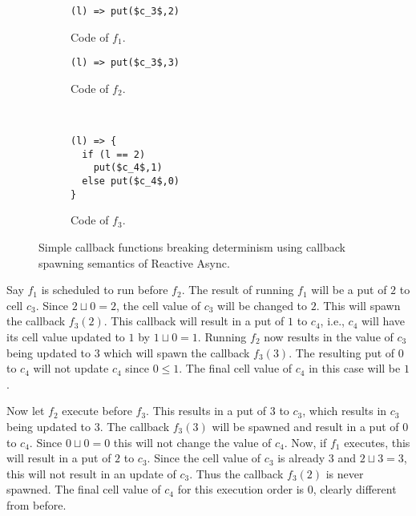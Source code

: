 \begin{figure}
  \begin{minipage}{0.5\textwidth}
    \begin{subfigure}[b]{\linewidth}
      \begin{lstlisting}
(l) => put($c_3$,2)
      \end{lstlisting}
      \caption{Code of $f_1$.}
    \end{subfigure}
    \begin{subfigure}[b]{\linewidth}
      \begin{lstlisting}
(l) => put($c_3$,3)
      \end{lstlisting}
      \caption{Code of $f_2$.}
    \end{subfigure}
  \end{minipage}
  ~
  \begin{minipage}{0.5\textwidth}
    \begin{subfigure}[b]{\linewidth}
      \begin{lstlisting}
(l) => {
  if (l == 2)
    put($c_4$,1)
  else put($c_4$,0)
}
      \end{lstlisting}
      \caption{Code of $f_3$.}
    \end{subfigure}
  \end{minipage}
  \caption{Simple callback functions breaking determinism using callback
  spawning semantics of Reactive Async.}
  \label{fig:ra_fun_callback_spawn}
\end{figure}

Say $f_1$ is scheduled to run before $f_2$. The result of running $f_1$ will be
a put of $2$ to cell $c_3$.  Since $2 \sqcup 0 = 2$, the cell value of $c_3$
will be changed to $2$. This will spawn the callback $f_3(2)$. This callback
will result in a put of $1$ to $c_4$, i.e., $c_4$ will have its cell value
updated to $1$ by $1 \sqcup 0 = 1$.  Running $f_2$ now results in the value of
$c_3$ being updated to $3$ which will spawn the callback $f_3(3)$. The resulting
put of $0$ to $c_4$ will not update $c_4$ since $0 \leq 1$. The final cell value
of $c_4$ in this case will be $1$.

Now let $f_2$ execute before $f_3$. This results in a put of $3$ to $c_3$, which
results in $c_3$ being updated to $3$. The callback $f_3(3)$ will be spawned and
result in a put of $0$ to $c_4$. Since $0 \sqcup 0 = 0$ this will not change the
value of $c_4$. Now, if $f_1$ executes, this will result in a put of $2$ to $c_3$.
Since the cell value of $c_3$ is already $3$ and $2 \sqcup 3 = 3$, this will not
result in an update of $c_3$. Thus the callback $f_3(2)$ is never spawned. The
final cell value of $c_4$ for this execution order is $0$, clearly different
from before.

